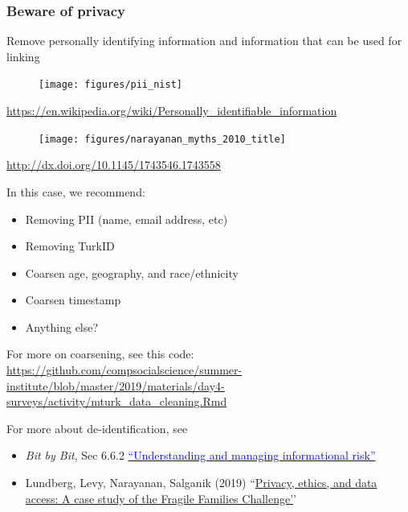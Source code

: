 \documentclass[aspectratio=169]{beamer}
\begin{document}
\begin{frame}
\frametitle{Beware of privacy}

Remove personally identifying information and information that can be used for linking

\begin{figure}
  \centering
  \texttt{[image: figures/pii\_nist]}
\end{figure}

\vfill
\url{https://en.wikipedia.org/wiki/Personally_identifiable_information}

\end{frame}
\begin{frame}

\begin{figure}
  \centering
  \texttt{[image: figures/narayanan\_myths\_2010\_title]}
\end{figure}

\vfill
\url{http://dx.doi.org/10.1145/1743546.1743558}
\end{frame}
\begin{frame}

In this case, we recommend:
\begin{itemize}
\item Removing PII (name, email address, etc)
\item Removing TurkID
\item Coarsen age, geography, and race/ethnicity
\item Coarsen timestamp
\item Anything else?
\end{itemize}

For more on coarsening, see this code:\\
\url{https://github.com/compsocialscience/summer-institute/blob/master/2019/materials/day4-surveys/activity/mturk_data_cleaning.Rmd}

\end{frame}
\begin{frame}

For more about de-identification, see 
\begin{itemize}
\item \textit{Bit by Bit}, Sec 6.6.2 \href{https://www.bitbybitbook.com/en/1st-ed/ethics/dilemmas/info-risk/}{\textcolor{blue}{``Understanding and managing informational risk''}}
\item Lundberg, Levy, Narayanan, Salganik (2019) ``\href{https://arxiv.org/abs/1809.00103}{Privacy, ethics, and data access: A case study of the Fragile Families Challenge'}'
\end{itemize}

\end{frame}
\end{document}
